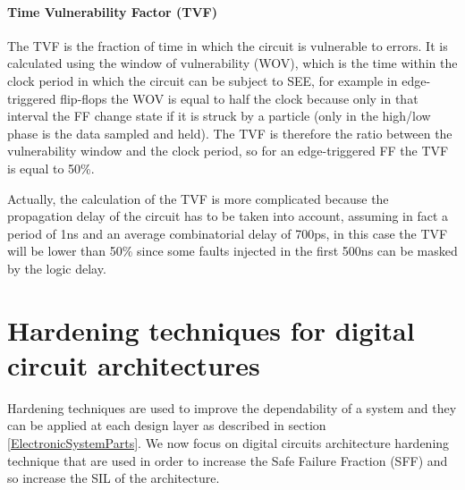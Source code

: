 {{{			\paragraph{Time Vulnerability Factor (TVF)}{
				The TVF is the fraction of time in which the circuit is vulnerable to errors. It is calculated using the window of vulnerability (WOV), which is the time within the clock period in which the circuit can be subject to SEE, for example in edge-triggered flip-flops the WOV is equal to half the clock because only in that interval the FF change state if it is struck by a particle (only in the high/low phase is the data sampled and held). The TVF is therefore the ratio between the vulnerability window and the clock period, so for an edge-triggered FF the TVF is equal to 50\%. 
				
				Actually, the calculation of the TVF is more complicated because the propagation delay of the circuit has to be taken into account, assuming in fact a period of 1ns and an average combinatorial delay of 700ps, in this case the TVF will be lower than 50\% since some faults injected in the first 500ns can be masked by the logic delay.
			}
				
			
		}%
		\newpage
			
			
	

		
	}%
	\section{Hardening techniques for digital circuit architectures}{
		Hardening techniques are used to improve the dependability of a system and they can be applied at each design layer as described in section \ref{ElectronicSystemParts}. We now focus on digital circuits architecture hardening technique that  are used in order to increase the Safe Failure Fraction (SFF) and so increase the SIL of the architecture.
		
}}
